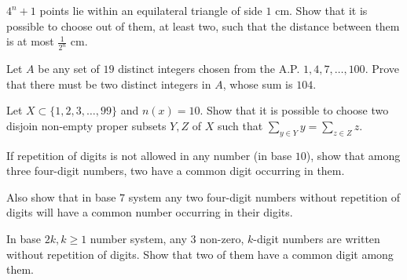 \item $4^n + 1$ points lie within an equilateral triangle of side $1$ cm. Show that it is possible to choose
  out of them, at least two, such that the distance between them is at most $\frac{1}{2^n}$ cm.
\item Let $A$ be any set of $19$ distinct integers chosen from the A.P. $1, 4, 7, \ldots, 100$. Prove that
  there must be two distinct integers in $A$, whose sum is $104$.
\item Let $X\subset \{1, 2, 3, \ldots, 99\}$ and $n(x) = 10$. Show that it is possible to choose two disjoin
  non-empty proper subsets $Y, Z$ of $X$ such that $\displaystyle\sum_{y\in Y}y = \sum_{z\in Z}z$.
\item If repetition of digits is not allowed in any number (in base $10$), show that among three four-digit
  numbers, two have a common digit occurring in them.

  Also show that in base $7$ system any two four-digit numbers without repetition of digits will have a
  common number occurring in their digits.
\item In base $2k, k\geq 1$ number system, any $3$ non-zero, $k$-digit numbers are written without
  repetition of digits. Show that two of them have a common digit among them.

